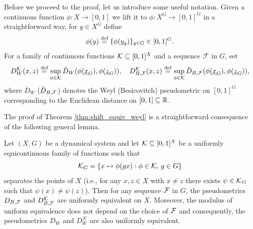 \noindent
Before we proceed to the proof, let us introduce some useful notation.
%
Given a continuous function $\phi\colon X\to[0,1]$ we lift it to $\phi:X^G \to [0,1]^G$ in a straightforward way, for $y\in X^G$ define
\[
\phi(y)\stackrel{\textup{def}}{=} \{\phi(y_g)\}_{g\in G}\in [0,1]^G.
\]
For a family of continuous functions $\operatorname{\mathcal{K}}\subseteq [0,1]^X$ and a \Folner sequence $\mathcal F$ in $G$, set
\[
D^{\mathcal{K}}_W(x,z)\defeq\sup_{\phi\in\mathcal{K}} \ddot{D}_W(\phi(\und{x}_G),\phi(\und z_G)),\quad
%
 D^{\mathcal{K}}_{B,\mathcal F}(x,z)\defeq \sup_{\phi\in\mathcal{K}} \ddot D_{B,\mathcal F}(\phi(\und{x}_G),\phi(\und z_G)),
\]
where $\ddot{D}_W$ ($\ddot{D}_{B,\operatorname{\mathcal{F}}}$) denotes the Weyl (Besicovitch) pseudometric on $[0,1]^G$ corresponding to the Euclidean distance on $[0,1]\subseteq\mathbb{R}$.


The proof of Theorem \ref{thm:shift_equiv_weyl} is a straightforward consequence of the following general lemma.

\begin{lem}\label{lem:familyF}
Let $(X,G)$ be a dynamical system and let
 $\operatorname{\mathcal{K}}\subseteq [0,1]^X$ be a uniformly equicontinuous family of functions such that
\[
\mathcal{K}_G=\{x\mapsto\phi(gx): \phi\in\operatorname{\mathcal{K}},\, g\in G\}
\]
separates the points of $X$ (i.e., for any $x,z\in X$ with $x\neq z$ there exists $\psi\in\operatorname{\mathcal{K}}_G$ such that $\psi(x)\neq\psi(z)$). Then for any \Folner sequence $\operatorname{\mathcal{F}}$ in $G$, the pseudometrics $D_{B,\operatorname{\mathcal{F}}}$ and $D^{\operatorname{\mathcal{K}}}_{B,\mathcal F}$ are uniformly equivalent on $X$. Moreover, the modulus of uniform equivalence does not depend on the choice of $\operatorname{\mathcal{F}}$ and consequently, the pseudometrics $D_W$ and $D^{\mathcal K}_W$ are also uniformly equivalent.
\end{lem}

